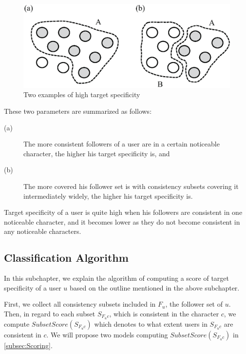 {\footnotesize
\begin{figure}[t]
\begin{center}
\includegraphics[width=14cm]{images/high_consistency.eps}
 \caption{Two examples of high target specificity}
\label{fig:High Consistency}
\end{center}
\end{figure}
}

These two parameters are summarized as follows:

\begin{description}
\item[(a)] The more consistent followers of a user are in a certain
           noticeable character, the higher his target specificity
           is, and
\item[(b)] The more covered his follower set is with consistency
           subsets covering it intermediately widely, the higher his
           target specificity is.
\end{description}

Target specificity of a user is quite high when his followers
are consistent in one noticeable character, and it becomes lower as they
do not become consistent in any noticeable characters.

\subsection{Classification Algorithm}
\label{subsec:Algorithm}

In this subchapter, we explain the algorithm of computing a score of
target specificity of a user $u$ based on the outline mentioned in the
above subchapter.

First, we collect all consistency subsets included in $F_u$, the
follower set of $u$.  Then, in regard to each subset $S_{F_uc}$, which
is consistent in
the character $c$, we compute
$\mathit{SubsetScore}(S_{F_uc})$ which denotes to what extent users in
$S_{F_uc}$ are consistent in $c$. We will propose two models
computing $\mathit{SubsetScore}(S_{F_uc})$ in \ref{subsec:Scoring}.

